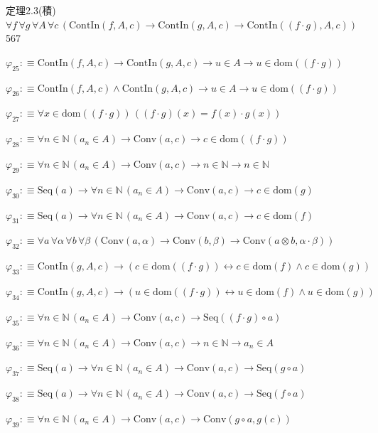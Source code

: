 \begin{fullproof}{定理2.3(積)}{$\forall f\,\forall g\,\forall A\,\forall c\,(\mathrm{ContIn}(f,A,c) \to \mathrm{ContIn}(g,A,c) \to \mathrm{ContIn}((f \cdot g),A,c))$}{567}
\begin{abbrevlist}
\item $\varphi_{25} :\equiv \mathrm{ContIn}(f,A,c) \to \mathrm{ContIn}(g,A,c) \to u \in A \to u \in \mathrm{dom}((f \cdot g))$
\item $\varphi_{26} :\equiv \mathrm{ContIn}(f,A,c) \land \mathrm{ContIn}(g,A,c) \to u \in A \to u \in \mathrm{dom}((f \cdot g))$
\item $\varphi_{27} :\equiv \forall x \in \mathrm{dom}((f \cdot g))\,((f \cdot g)(x) = f(x) \cdot g(x))$
\item $\varphi_{28} :\equiv \forall n \in \mathbb{N}\,(a_{n} \in A) \to \mathrm{Conv}(a,c) \to c \in \mathrm{dom}((f \cdot g))$
\item $\varphi_{29} :\equiv \forall n \in \mathbb{N}\,(a_{n} \in A) \to \mathrm{Conv}(a,c) \to n \in \mathbb{N} \to n \in \mathbb{N}$
\item $\varphi_{30} :\equiv \mathrm{Seq}(a) \to \forall n \in \mathbb{N}\,(a_{n} \in A) \to \mathrm{Conv}(a,c) \to c \in \mathrm{dom}(g)$
\item $\varphi_{31} :\equiv \mathrm{Seq}(a) \to \forall n \in \mathbb{N}\,(a_{n} \in A) \to \mathrm{Conv}(a,c) \to c \in \mathrm{dom}(f)$
\item $\varphi_{32} :\equiv \forall a\,\forall \alpha\,\forall b\,\forall \beta\,(\mathrm{Conv}(a,\alpha) \to \mathrm{Conv}(b,\beta) \to \mathrm{Conv}(a \otimes b,\alpha \cdot \beta))$
\item $\varphi_{33} :\equiv \mathrm{ContIn}(g,A,c) \to (c \in \mathrm{dom}((f \cdot g)) \leftrightarrow c \in \mathrm{dom}(f) \land c \in \mathrm{dom}(g))$
\item $\varphi_{34} :\equiv \mathrm{ContIn}(g,A,c) \to (u \in \mathrm{dom}((f \cdot g)) \leftrightarrow u \in \mathrm{dom}(f) \land u \in \mathrm{dom}(g))$
\item $\varphi_{35} :\equiv \forall n \in \mathbb{N}\,(a_{n} \in A) \to \mathrm{Conv}(a,c) \to \mathrm{Seq}((f \cdot g) \circ a)$
\item $\varphi_{36} :\equiv \forall n \in \mathbb{N}\,(a_{n} \in A) \to \mathrm{Conv}(a,c) \to n \in \mathbb{N} \to a_{n} \in A$
\item $\varphi_{37} :\equiv \mathrm{Seq}(a) \to \forall n \in \mathbb{N}\,(a_{n} \in A) \to \mathrm{Conv}(a,c) \to \mathrm{Seq}(g \circ a)$
\item $\varphi_{38} :\equiv \mathrm{Seq}(a) \to \forall n \in \mathbb{N}\,(a_{n} \in A) \to \mathrm{Conv}(a,c) \to \mathrm{Seq}(f \circ a)$
\item $\varphi_{39} :\equiv \forall n \in \mathbb{N}\,(a_{n} \in A) \to \mathrm{Conv}(a,c) \to \mathrm{Conv}(g \circ a,g(c))$

\end{abbrevlist}
\end{fullproof}
